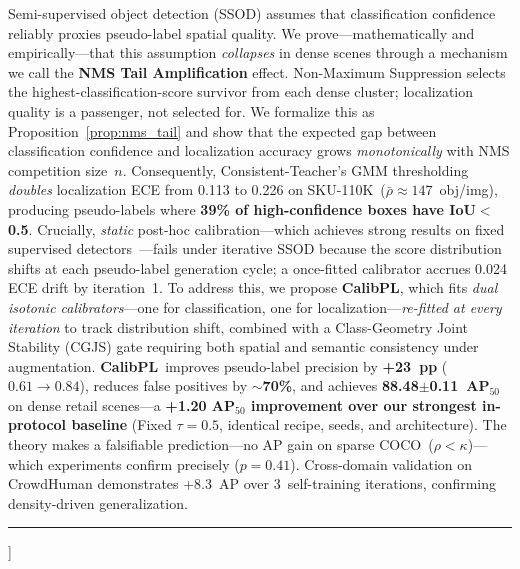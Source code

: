 \documentclass[10pt,twocolumn,letterpaper]{article}
\newcommand{\method}{\textbf{CalibPL}\xspace}
\newcommand{\coco}{\textsc{COCO}\xspace}
\newcommand{\sku}{\textsc{SKU-110K}\xspace}
\begin{document}
{%
\begin{wacvabstract}
Semi-supervised object detection (SSOD) assumes that classification confidence
reliably proxies pseudo-label spatial quality. We prove---mathematically and
empirically---that this assumption \emph{collapses} in dense scenes through a
mechanism we call the \textbf{NMS Tail Amplification} effect. Non-Maximum
Suppression selects the highest-classification-score survivor from each dense
cluster; localization quality is a passenger, not selected for. We formalize
this as Proposition~\ref{prop:nms_tail} and show that the expected gap between
classification confidence and localization accuracy grows \emph{monotonically}
with NMS competition size~$n$. Consequently, Consistent-Teacher's GMM
thresholding \emph{doubles} localization ECE from 0.113 to 0.226 on \sku\
($\bar{\rho}{\approx}147$~obj/img), producing pseudo-labels where
\textbf{39\% of high-confidence boxes have IoU$<$0.5}. Crucially, \emph{static}
post-hoc calibration---which achieves strong results on fixed supervised
detectors~\cite{kuzucu2024calibration}---fails under iterative SSOD because the
score distribution shifts at each pseudo-label generation cycle; a
once-fitted calibrator accrues 0.024 ECE drift by iteration~1.
To address this, we propose \method, which fits \emph{dual isotonic
calibrators}---one for classification, one for localization---\emph{re-fitted
at every iteration} to track distribution shift, combined with a
Class-Geometry Joint Stability (CGJS) gate requiring both spatial and semantic
consistency under augmentation.
\method\ improves pseudo-label precision by \textbf{+23~pp} ($0.61{\to}0.84$),
reduces false positives by \textbf{$\sim$70\%}, and achieves
\textbf{88.48$\pm$0.11~AP$_{50}$} on dense retail scenes---a \textbf{+1.20
AP$_{50}$ improvement over our strongest in-protocol baseline} (Fixed
$\tau{=}0.5$, identical recipe, seeds, and architecture). The theory makes a
falsifiable prediction---no AP gain on sparse \coco\ ($\rho {<} \kappa$)---which
experiments confirm precisely ($p{=}0.41$). Cross-domain validation on
CrowdHuman demonstrates +8.3~AP over 3~self-training iterations, confirming
density-driven generalization.
\end{wacvabstract}
\vspace{0.3em}
\noindent\rule{\linewidth}{0.2pt}
\vspace{0.8em}
}] %
\end{document}
